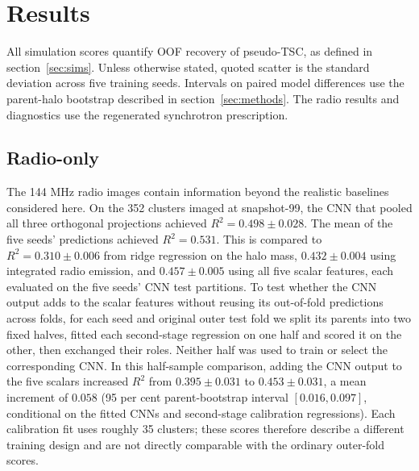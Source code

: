\section{Results}
\label{sec:results}

All simulation scores quantify OOF recovery of pseudo-TSC, as defined in section~\ref{sec:sims}.
Unless otherwise stated, quoted scatter is the standard deviation across five training seeds.
Intervals on paired model differences use the parent-halo bootstrap described in section~\ref{sec:methods}.
The radio results and diagnostics use the regenerated synchrotron prescription.

\subsection{Radio-only}

The 144 MHz radio images contain information beyond the realistic baselines considered here.
On the 352 clusters imaged at snapshot-99, the CNN that pooled all three orthogonal projections achieved $R^2 = 0.498 \pm 0.028$.
The mean of the five seeds' predictions achieved $R^2 = 0.531$.
This is compared to $R^2 = 0.310 \pm 0.006$ from ridge regression on the halo mass, $0.432 \pm 0.004$ using integrated radio emission, and $0.457 \pm 0.005$ using all five scalar features, each evaluated on the five seeds' CNN test partitions.
To test whether the CNN output adds to the scalar features without reusing its out-of-fold predictions across folds, for each seed and original outer test fold we split its parents into two fixed halves, fitted each second-stage regression on one half and scored it on the other, then exchanged their roles.
Neither half was used to train or select the corresponding CNN.
In this half-sample comparison, adding the CNN output to the five scalars increased $R^2$ from $0.395 \pm 0.031$ to $0.453 \pm 0.031$, a mean increment of $0.058$ (95 per cent parent-bootstrap interval $[0.016, 0.097]$, conditional on the fitted CNNs and second-stage calibration regressions).
Each calibration fit uses roughly 35 clusters; these scores therefore describe a different training design and are not directly comparable with the ordinary outer-fold scores.

